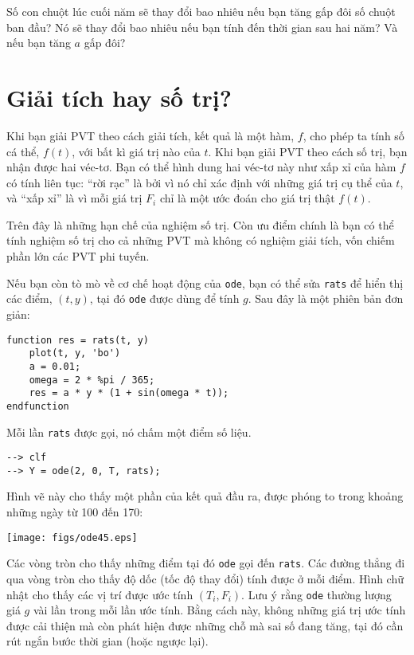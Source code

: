 \documentclass[12pt]{book}
\begin{document}
Số con chuột lúc cuối năm sẽ thay đổi bao nhiêu nếu bạn tăng
gấp đôi số chuột ban đầu? Nó sẽ thay đổi bao nhiêu nếu bạn 
tính đến thời gian sau hai năm? Và nếu bạn tăng $a$ gấp đôi?


\section{Giải tích hay số trị?}

Khi bạn giải PVT theo cách giải tích, kết quả là một hàm, $f$,
cho phép ta tính số cá thể, $f(t)$, với bất kì giá trị nào của
$t$.  Khi bạn giải PVT theo cách số trị, bạn nhận được hai véc-tơ.
Bạn có thể hình dung hai véc-tơ này như xấp xỉ của hàm $f$ 
có tính liên tục: ``rời rạc'' là bởi vì nó chỉ xác định với những
giá trị cụ thể của $t$, và ``xấp xỉ'' là vì mỗi giá trị $F_i$
chỉ là một ước đoán cho giá trị thật $f(t)$.

Trên đây là những hạn chế của nghiệm số trị. Còn ưu điểm chính
là bạn có thể tính nghiệm số trị cho cả những PVT mà không có
nghiệm giải tích, vốn chiếm phần lớn các PVT phi tuyến.

Nếu bạn còn tò mò về cơ chế hoạt động của {\tt ode},
bạn có thể sửa {\tt rats} để hiển thị các điểm, $(t, y)$, 
tại đó {\tt ode} được dùng để tính $g$. Sau đây là một
phiên bản đơn giản:

\begin{verbatim}
function res = rats(t, y)
    plot(t, y, 'bo')
    a = 0.01;
    omega = 2 * %pi / 365;
    res = a * y * (1 + sin(omega * t));
endfunction
\end{verbatim}
%
Mỗi lần {\tt rats} được gọi, nó chấm một điểm số liệu.

\begin{verbatim}
--> clf
--> Y = ode(2, 0, T, rats);
\end{verbatim}
%
Hình vẽ này cho thấy một phần của kết quả đầu ra, được phóng to
trong khoảng những ngày từ 100 đến 170:

\centerline{\texttt{[image: figs/ode45.eps]}}

Các vòng tròn cho thấy những điểm tại đó {\tt ode} gọi đến 
{\tt rats}. Các đường thẳng đi qua vòng tròn cho thấy độ dốc
(tốc độ thay đổi) tính được ở mỗi điểm. Hình chữ nhật cho thấy
các vị trí được ước tính $(T_i, F_i)$.  Lưu ý rằng {\tt ode}
thường lượng giá $g$ vài lần trong mỗi lần ước tính. Bằng cách
này, không những giá trị ước tính được cải thiện mà còn phát
hiện được những chỗ mà sai số đang tăng, tại đó cần rút ngắn
bước thời gian (hoặc ngược lại).
\end{document}
